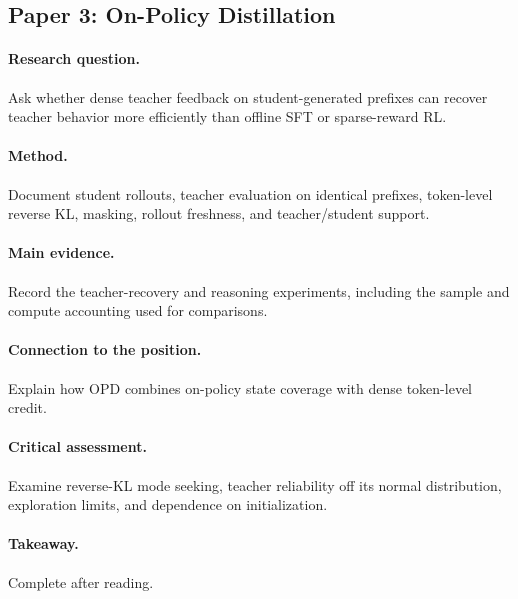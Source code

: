 \subsection{Paper 3: On-Policy Distillation \citep{lu2025onpolicydistillation}}
\paragraph{Research question.} Ask whether dense teacher feedback on student-generated prefixes can recover teacher behavior more efficiently than offline SFT or sparse-reward RL.
\paragraph{Method.} Document student rollouts, teacher evaluation on identical prefixes, token-level reverse KL, masking, rollout freshness, and teacher/student support.
\paragraph{Main evidence.} Record the teacher-recovery and reasoning experiments, including the sample and compute accounting used for comparisons.
\paragraph{Connection to the position.} Explain how OPD combines on-policy state coverage with dense token-level credit.
\paragraph{Critical assessment.} Examine reverse-KL mode seeking, teacher reliability off its normal distribution, exploration limits, and dependence on initialization.
\paragraph{Takeaway.} Complete after reading.
